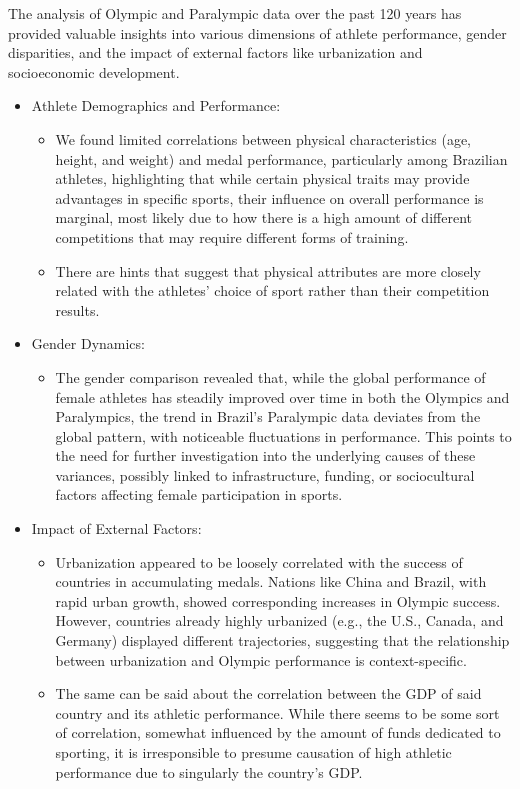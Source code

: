 \documentclass{article}
\begin{document}
The analysis of Olympic and Paralympic data over the past 120 years has provided valuable insights into various dimensions of athlete performance, gender disparities, and the impact of external factors like urbanization and socioeconomic development.
\begin{itemize}
    \item Athlete Demographics and Performance: \begin{itemize}
        \item We found limited correlations between physical characteristics (age, height, and weight) and medal performance, particularly among Brazilian athletes, highlighting that while certain physical traits may provide advantages in specific sports, their influence on overall performance is marginal, most likely due to how there is a high amount of different competitions that may require different forms of training. \item There are hints that suggest that physical attributes are more closely related with the athletes' choice of sport rather than their competition results.
    \end{itemize}
    \item Gender Dynamics:
    \begin{itemize}
        \item The gender comparison revealed that, while the global performance of female athletes has steadily improved over time in both the Olympics and Paralympics, the trend in Brazil’s Paralympic data deviates from the global pattern, with noticeable fluctuations in performance. This points to the need for further investigation into the underlying causes of these variances, possibly linked to infrastructure, funding, or sociocultural factors affecting female participation in sports.
    \end{itemize}
    \item Impact of External Factors:
    \begin{itemize}
        \item Urbanization appeared to be loosely correlated with the success of countries in accumulating medals. Nations like China and Brazil, with rapid urban growth, showed corresponding increases in Olympic success. However, countries already highly urbanized (e.g., the U.S., Canada, and Germany) displayed different trajectories, suggesting that the relationship between urbanization and Olympic performance is context-specific.
        \item The same can be said about the correlation between the GDP of said country and its athletic performance. While there seems to be some sort of correlation, somewhat influenced by the amount of funds dedicated to sporting, it is irresponsible to presume causation of high athletic performance due to singularly the country's GDP.
    \end{itemize}
\end{itemize}
\end{document}
